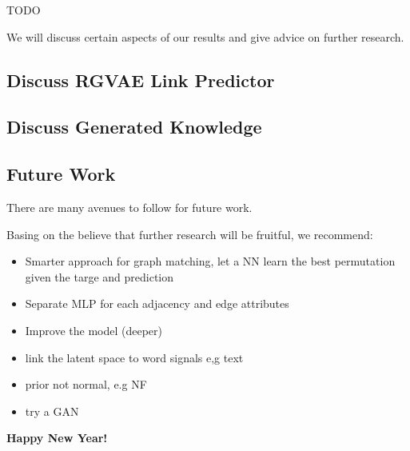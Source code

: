 
TODO

We will discuss certain aspects of our results and give advice on further research.

\subsection{Discuss RGVAE Link Predictor}


\subsection{Discuss Generated Knowledge}


\subsection{Future Work}

There are many avenues to follow for future work.

Basing on the believe that further research will be fruitful, we recommend:

\begin{itemize}
    \item Smarter approach for graph matching, let a NN learn the best permutation given the targe and prediction
    \item Separate MLP for each adjacency and edge attributes
    \item Improve the model (deeper)
    \item link the latent space to word signals e,g text
    \item prior not normal, e.g NF
    \item try a GAN
\end{itemize}


\textbf{Happy New Year!}
